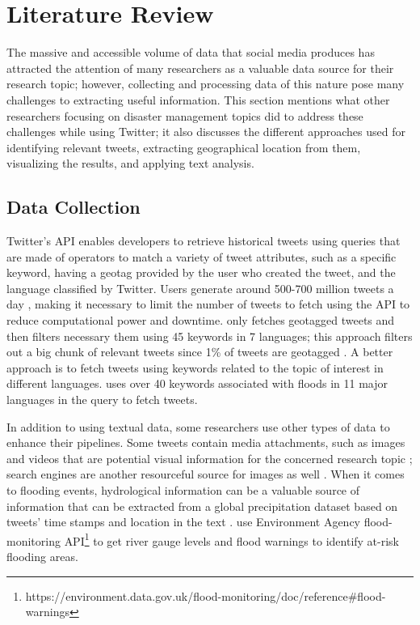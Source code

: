 \section{Literature Review}

The massive and accessible volume of data that social media produces has attracted the attention of
many researchers as a valuable data source for their research topic; however, collecting and
processing data of this nature pose many challenges to extracting useful information. This section
mentions what other researchers focusing on disaster management topics did to address these
challenges while using Twitter; it also discusses the different approaches used for identifying
relevant tweets, extracting geographical location from them, visualizing the results, and applying
text analysis.

\subsection{Data Collection} Twitter's \ac{API} enables developers to retrieve historical tweets using
queries that are made of operators to match a variety of tweet attributes, such as a specific
keyword, having a geotag provided by the user who created the tweet, and the language classified by
Twitter. Users generate around 500-700 million tweets a day \cite{inproceedings}, making it
necessary to limit the number of tweets to fetch using the \ac{API} to reduce computational power and
downtime.  only fetches geotagged tweets and then filters
necessary
them using 45 keywords in 7 languages; this approach filters out a big chunk of relevant tweets
since 1\% of tweets are geotagged \cite{middletonRealTimeCrisisMapping2014}. A better approach is to
fetch tweets using keywords related to the topic of interest in different languages.
 uses over 40 keywords associated with floods in 11
major languages in the query to fetch tweets.

In addition to using textual data, some researchers use other types of data to enhance their
pipelines. Some tweets contain media attachments, such as images and videos that are potential
visual information for the concerned research topic
\cite{alamFloodDetectionTwitter2020}\cite{saidFloodsDetectionTwitter2020}\cite{ningPrototypingSocialMedia2020};
search engines are another resourceful source for images as well
\cite{fengExtractionPluvialFlood2018}. When it comes to flooding events, hydrological information
can be a valuable source of information that can be extracted from a global precipitation dataset
based on tweets' time stamps and location in the text
\cite{debruijnImprovingClassificationFlood2020}.
 use Environment Agency flood-monitoring
\ac{API}\footnote{https://environment.data.gov.uk/flood-monitoring/doc/reference\#flood-warnings} to
get river gauge levels and flood warnings to identify at-risk flooding areas.

